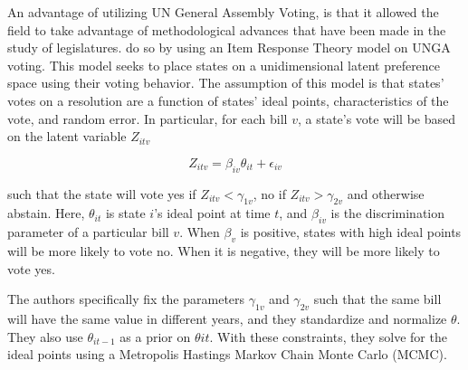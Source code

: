 
An advantage of utilizing UN General Assembly Voting, is that it allowed the field to take advantage of methodological advances that have been made in the study of legislatures. \citet{bailey:etal:2015} do so by using an Item Response Theory model on UNGA voting. This model seeks to place states on a unidimensional latent preference space using their voting behavior. The assumption of this model is that states' votes on a resolution are a function of states' ideal points, characteristics of the vote, and random error. In particular, for each bill $v$, a state's vote will be based on the latent variable $Z_{itv}$

\begin{equation}
	Z_{itv} = \beta_{iv}\theta_{it} + \epsilon_{iv}
\end{equation}

such that the state will vote yes if $Z_{itv} < \gamma_{1v}$, no if $Z_{itv} > \gamma_{2v}$ and otherwise abstain. Here, $\theta_{it}$ is state $i$'s ideal point at time $t$, and $\beta_{iv}$ is the discrimination parameter of a particular bill $v$. When $\beta_{v}$ is positive, states with high ideal points will be more likely to vote no. When it is negative, they will be more likely to vote yes.

The authors specifically fix the parameters $\gamma_{1v}$ and $\gamma_{2v}$ such that the same bill will have the same value in different years, and they standardize and normalize $\theta$. They also use $\theta_{it-1}$ as a prior on $\theta{it}$. With these constraints, they solve for the ideal points using a Metropolis Hastings Markov Chain Monte Carlo (MCMC).

